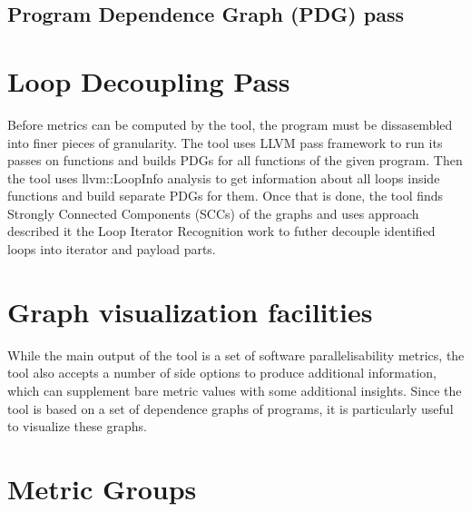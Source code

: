 \subsection{Program Dependence Graph (PDG) pass}

\section{Loop Decoupling Pass}
\qquad Before metrics can be computed by the tool, the program must be dissasembled into finer pieces of granularity. The tool uses LLVM pass framework to run its passes on functions and builds PDGs for all functions of the given program. Then the tool uses llvm::LoopInfo analysis to get information about all loops inside functions and build separate PDGs for them. Once that is done, the tool finds Strongly Connected Components (SCCs) of the graphs and uses approach described it the Loop Iterator Recognition work \cite{iterator-recognition} to futher decouple identified loops into iterator and payload parts.          

\section{Graph visualization facilities}
\qquad While the main output of the tool is a set of software parallelisability metrics, the tool also accepts a number of side options to produce additional information, which can supplement bare metric values with some additional insights. Since the tool is based on a set of dependence graphs of programs, it is particularly useful to visualize these graphs.  

\section{Metric Groups}